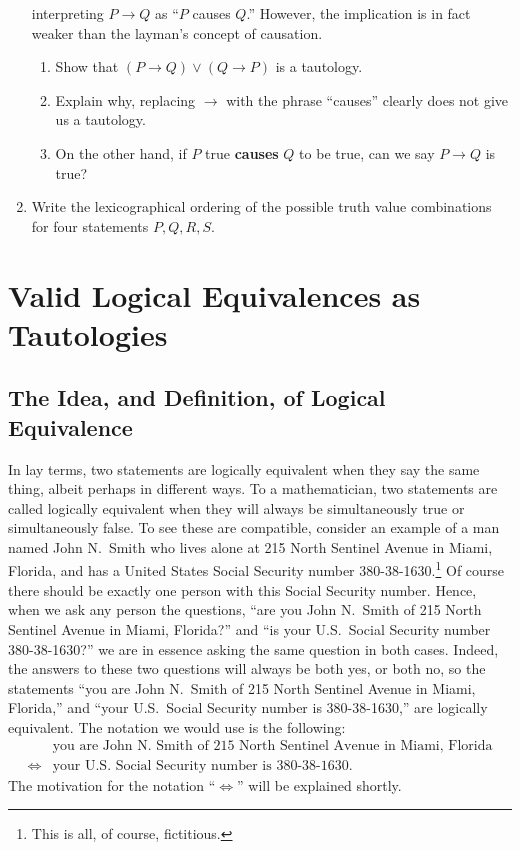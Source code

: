 \begin{multicols}{2}
\begin{enumerate}
      interpreting $P\longrightarrow Q$ as ``$P$ causes $Q$.''
      However, the implication is in fact weaker than the layman's
      concept of causation. 
  \begin{enumerate}
  \item Show that $(P\longrightarrow Q)\vee(Q\longrightarrow P)$
      is a tautology.
  \item Explain why, replacing $\longrightarrow$ with the phrase
      ``causes'' clearly does not give us a tautology.
  \item On the other hand, if $P$ true {\bf causes} $Q$ to be
      true, can we say $P\longrightarrow Q$ is true?
  \end{enumerate}
\item Write the lexicographical ordering of the possible
   truth value combinations for four statements $P,Q,R,S$.
\end{enumerate}
\end{multicols}




\newpage
\section{Valid Logical Equivalences as Tautologies
\label{TVLEI}} 

\subsection{The Idea, and Definition, of Logical Equivalence}
In lay terms, two statements are logically equivalent when they 
say the same thing, albeit perhaps in different ways.
To a mathematician, two statements are called logically equivalent
when they will always be simultaneously true or simultaneously 
false. To see these are compatible, consider an example of
a man named John N.\ Smith who
lives alone at 215 North Sentinel Avenue in Miami, Florida, and
has a United States Social Security number 380-38-1630.\footnote{%
This is all, of course, fictitious.}
Of course there should be exactly one person with this Social
Security number.  Hence, when we ask  any person
the questions, ``are you John N.\ Smith of 215 North Sentinel Avenue
in Miami, Florida?'' and ``is your U.S.\ Social Security number
380-38-1630?'' we are in essence asking the same
question in both cases.  
Indeed, the answers to these two questions will always be
both yes, or both no,  so the statements ``you are John N.\ Smith
of  215 North Sentinel Avenue
in Miami, Florida,'' and ``your U.S.\ Social Security number is 380-38-1630,''
are logically equivalent.
The notation we would use is the following:
\begin{align*}
&\text{you are John N.\ Smith of 215 North Sentinel Avenue in Miami, Florida}\\
\iff
&\text{your U.S.\ Social Security number is 380-38-1630}.
\end{align*}
The motivation for the notation ``$\iff$'' will be explained shortly.

